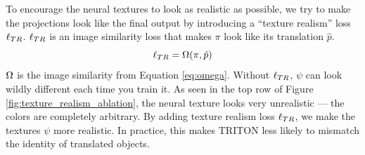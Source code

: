 \documentclass{article}
\begin{document}
		To encourage the neural textures to look as realistic as possible, we try to make the projections look like the final output by introducing a ``texture realism'' loss $\ell_{TR}$. 
		$\ell_{TR}$ is an image similarity loss that makes $\pi$ look like its translation $\hat{p}$.
		\begin{equation}
			\ell_{TR} = \Omega(\pi,\hat{p})
		\end{equation}
		$\Omega$ is the image similarity from Equation \ref{eq:omega}. Without $\ell_{TR}$, $\psi$ can look wildly different each time you train it.
		As seen in the top row of Figure \ref{fig:texture_realism_ablation}, the neural texture looks very unrealistic --- the colors are completely arbitrary.
        By adding texture realism loss $\ell_{TR}$, we make the textures $\psi$ more realistic. In practice, this makes TRITON less likely to mismatch the identity of translated objects.
\end{document}
